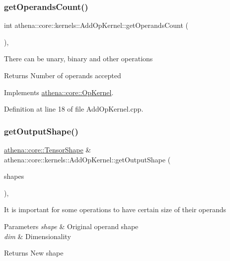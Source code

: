 \subsubsection{\texorpdfstring{get\+Operands\+Count()}{getOperandsCount()}}
{\footnotesize\ttfamily int athena\+::core\+::kernels\+::\+Add\+Op\+Kernel\+::get\+Operands\+Count (\begin{DoxyParamCaption}{ }\end{DoxyParamCaption})\hspace{0.3cm}{\ttfamily [override]}, {\ttfamily [virtual]}}

There can be unary, binary and other operations \begin{DoxyReturn}{Returns}
Number of operands accepted 
\end{DoxyReturn}


Implements \mbox{\hyperlink{classathena_1_1core_1_1_op_kernel_add97d4c132d80ecd9915acfedf7c9119}{athena\+::core\+::\+Op\+Kernel}}.



Definition at line 18 of file Add\+Op\+Kernel.\+cpp.

\mbox{\label{classathena_1_1core_1_1kernels_1_1_add_op_kernel_a687d68d7374e9546f01cefcbfb382d04}} 
\subsubsection{\texorpdfstring{get\+Output\+Shape()}{getOutputShape()}}
{\footnotesize\ttfamily \mbox{\hyperlink{classathena_1_1core_1_1_tensor_shape}{athena\+::core\+::\+Tensor\+Shape}} \& athena\+::core\+::kernels\+::\+Add\+Op\+Kernel\+::get\+Output\+Shape (\begin{DoxyParamCaption}\item[{std\+::vector$<$ \mbox{\hyperlink{classathena_1_1core_1_1_tensor_shape}{athena\+::core\+::\+Tensor\+Shape}} $>$ \&}]{shapes }\end{DoxyParamCaption})\hspace{0.3cm}{\ttfamily [override]}, {\ttfamily [virtual]}}

It is important for some operations to have certain size of their operands 
\begin{DoxyParams}{Parameters}
{\em shape} & Original operand shape \\
\hline
{\em dim} & Dimensionality \\
\hline
\end{DoxyParams}
\begin{DoxyReturn}{Returns}
New shape 
\end{DoxyReturn}


